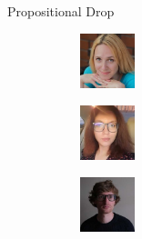 \documentclass[
  ignorenonframetext,
  t]{beamer}
\begin{document}
\begin{frame}{Propositional Drop}
\label{propositional-drop}
\begin{figure}

\begin{minipage}{0.33\linewidth}

\begin{figure}[H]

{\centering \includegraphics[width=0.63in,height=\textheight]{images/yakovleva.jpg}

}


\end{figure}%

\end{minipage}%
%
\begin{minipage}{0.33\linewidth}

\begin{figure}[H]

{\centering \includegraphics[width=0.63in,height=\textheight]{images/koshelyuk.jpeg}

}


\end{figure}%

\end{minipage}%
%
\begin{minipage}{0.33\linewidth}

\begin{figure}[H]

{\centering \includegraphics[width=0.63in,height=\textheight]{images/moroz.jpeg}

}


\end{figure}%

\end{minipage}%

\end{figure}%
\end{frame}
\end{document}
